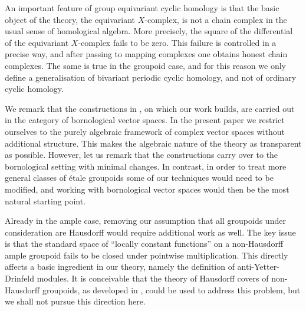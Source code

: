 \documentclass{amsart}
\begin{document}
An important feature of group equivariant cyclic homology is that the basic object of the theory, the equivariant $ X $-complex, is not a chain complex in the usual sense of homological algebra. More precisely, the square of the differential of the equivariant $ X $-complex fails to be zero. This failure is controlled in a precise way, and after passing to mapping complexes one obtains honest chain complexes. The same is true in the groupoid case, and for this reason we only define a generalisation of bivariant periodic cyclic homology, and not of ordinary cyclic homology. 

We remark that the constructions in \cite{VOIGT_equivariantperiodiccyclichomology}, on which our work builds, are carried out in the category of bornological vector spaces. In the present paper we restrict ourselves to the purely algebraic framework of complex vector spaces without additional structure. 
This makes the algebraic nature of the theory as transparent as possible. However, let us remark that the constructions carry over to the bornological setting with minimal changes. 
In contrast, in order to treat more general classes of \'etale groupoids some of our techniques would need to be modified, and working with bornological vector spaces would then be the most natural starting point. 

Already in the ample case, removing our assumption that all groupoids under consideration are Hausdorff would require additional work as well. The key issue is that the standard space of ``locally constant functions'' on a non-Hausdorff ample groupoid fails to be closed under pointwise multiplication. This directly affects a basic ingredient in our theory, namely the definition of anti-Yetter-Drinfeld modules. It is conceivable that the theory of Hausdorff covers of non-Hausdorff groupoids, as developed in \cite{BRIX_GONZALES_HUME_LI_hausdorffcovers}, could be used to address this problem, but we shall not pursue this direction here.    
\end{document}
